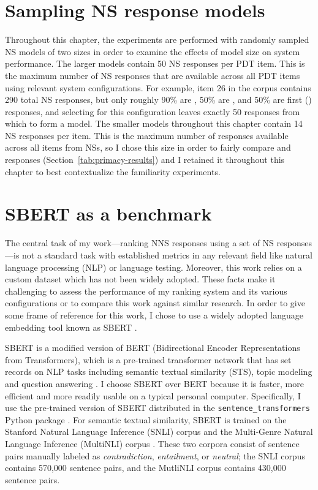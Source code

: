 \section{Sampling NS response models}
\label{sec:sampling}

Throughout this chapter, the experiments are performed with randomly sampled NS models of two sizes in order to examine the effects of model size on system performance. The larger models contain 50 NS responses per PDT item. This is the maximum number of NS responses that are available across all PDT items using relevant system configurations. For example, item 26 in the corpus contains 290 total NS responses, but only roughly 90\% are , 50\% are , and 50\% are first () responses, and selecting for this configuration leaves exactly 50 responses from which to form a model. The smaller models throughout this chapter contain 14 NS responses per item. This is the maximum number of responses available across all items from  NSs, so I chose this size in order to fairly compare  and  responses (Section~\ref{tab:primacy-results}) and I retained it throughout this chapter to best contextualize the familiarity experiments.

\section{SBERT as a benchmark}
\label{sec:bert-benchmark}
The central task of my work---ranking NNS responses using a set of NS responses---is not a standard task with established metrics in any relevant field like natural language processing (NLP) or language testing. Moreover, this work relies on a custom dataset which has not been widely adopted. These facts make it challenging to assess the performance of my ranking system and its various configurations or to compare this work against similar research. In order to give some frame of reference for this work, I chose to use a widely adopted language embedding tool known as SBERT \cite{sbert2020}.

SBERT is a modified version of BERT (Bidirectional Encoder Representations from Transformers), which is a pre-trained transformer network that has set records on NLP tasks including semantic textual similarity (STS), topic modeling and question answering \cite{BertDevlin2018}. I choose SBERT over BERT because it is faster, more efficient and more readily usable on a typical personal computer. Specifically, I use the pre-trained version of SBERT distributed in the \texttt{sentence\_transformers} Python package \cite{sbert-python}. For semantic textual similarity, SBERT is trained on the Stanford Natural Language Inference (SNLI) corpus \cite{bowman2015} and the Multi-Genre Natural Language Inference (MultiNLI) corpus \cite{MultiNLI2018}. These two corpora consist of sentence pairs manually labeled as \textit{contradiction}, \textit{entailment}, or \textit{neutral}; the SNLI corpus contains 570,000 sentence pairs, and the MutliNLI corpus contains 430,000 sentence pairs.
 

